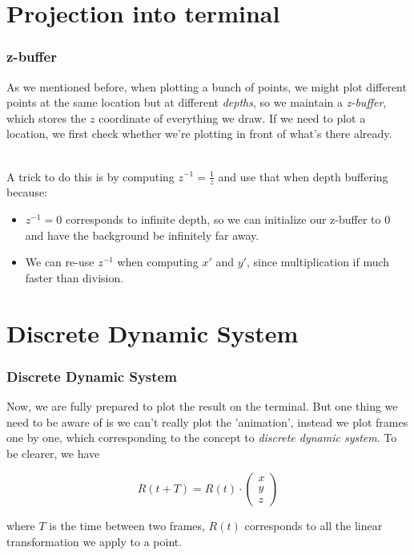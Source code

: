 \documentclass[12pt, t]{beamer}
\renewcommand{\emph}[1]{{\color{Turquoise3}\textsl{#1}}}
\newcommand{\nullspace}{~\\[15pt]}
\begin{document}
\section{Projection into terminal}
\begin{frame}
    \frametitle{z-buffer}

    As we mentioned before, when plotting a bunch of points, we might plot different points at the 
    same location but at different \emph{depths}, so we maintain a \emph{z-buffer}, which stores 
    the $z$ coordinate of everything we draw. If we need to plot a location, we first check whether 
    we're plotting in front of what's there already.

    \nullspace
    A trick to do this is by computing $z^{-1} = \frac{1}{z}$ and use that when depth buffering 
    because:
    \begin{itemize}
        \item $z^{-1} = 0$ corresponds to infinite depth, so we can initialize our z-buffer to 0 and 
            have the background be infinitely far away.
        \item We can re-use $z^{-1}$ when computing $x'$ and $y'$, since multiplication if much faster 
            than division.
    \end{itemize}

\end{frame}


\section{Discrete Dynamic System}
\begin{frame}
    \frametitle{Discrete Dynamic System}

    Now, we are fully prepared to plot the result on the terminal. But one thing we need to be aware
    of is we can't really plot the 'animation', instead we plot frames one by one, which corresponding 
    to the concept to \emph{discrete dynamic system}. To be clearer, we have

    \begin{equation*}
        R(t + T) = R(t)
        \cdot
        \begin{pmatrix}
            x   \\
            y   \\
            z
        \end{pmatrix}
    \end{equation*}

    where $T$ is the time between two frames, $R(t)$ corresponds to all the linear transformation we 
    apply to a point.

\end{frame}
\end{document}
